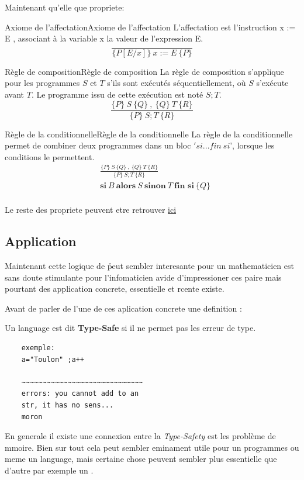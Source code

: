 \documentclass[French,Hoar.tex]{subfiles}
\begin{document}
Maintenant qu'elle que propriete:

  \begin{mytheo}{Axiome de l'affectation}{Axiome de l'affectation}
    L'affectation est l'instruction x := E , associant à la variable x la valeur de l'expression E.
    $$
    \frac{}{\{P[E/x]\}\ x:=E \ \{P\} } 
    $$
  \end{mytheo}


  \begin{mytheo}{Règle de composition}{Règle de composition}
    La règle de composition s'applique pour les programmes $S$ et $T$ s'ils sont exécutés séquentiellement, où $S$ s'exécute avant $T$. Le programme issu de cette exécution est noté $S;T$.
    $$
 \frac {\{P\}\ S\ \{Q\}\ , \ \{Q\}\ T\ \{R\} } {\{P\}\ S;T\ \{R\}}
    $$
  \end{mytheo}


  \begin{mytheo}{Règle de la conditionnelle}{Règle de la conditionnelle}
La règle de la conditionnelle permet de combiner deux programmes dans un bloc $'si...fin\ si$', lorsque les conditions le permettent.
    \begin{align*}
 &\frac {\{P\}\ S\ \{Q\}\ , \ \{Q\}\ T\ \{R\} } {\{P\}\ S;T\ \{R\}}\\
 &\textbf{si}\ B\ \textbf{alors}\ S\ \textbf{sinon}\ T\ \textbf{fin\ si}\ \{Q\}\\
 \end{align*}

  \end{mytheo}
  Le reste des propriete peuvent etre retrouver \href{https://fr.wikipedia.org/wiki/Logique_de_Hoare#Axiome_de_l%27affectation}{ici}
  \subsection{Application}
  Maintenant cette logique de \h peut sembler interesante pour un mathematicien est sans doute stimulante pour
  l'infomaticien avide d'impressioner ces paire mais pourtant des application concrete, essentielle et r\e cente existe.

  Avant de parler de l'une de ces aplication concrete une definition :
   \begin{definition}
    Un language est dit \textbf{Type-Safe} si il ne permet pas les erreur de type.
  \end{definition}
  \begin{verbatim}
    exemple:
    a="Toulon" ;a++

    ~~~~~~~~~~~~~~~~~~~~~~~~~~~~~
    errors: you cannot add to an
    str, it has no sens...
    moron
  \end{verbatim}
  En generale il existe une connexion entre la \emph{Type-Safety} est les problème de m\e moire.
  Bien sur tout cela peut sembler eminament utile pour un programmes ou meme un language, mais certaine
  chose peuvent sembler plus essentielle que d'autre par exemple un \text{\color{nred}{OS}}.
\end{document}
